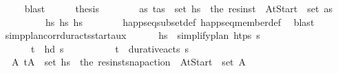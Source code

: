 \begin{isabellebody}
\ \ \ \ \ \ \isamarkupfalse%
\ blast\isanewline
\ \ \ \ \isamarkupfalse%
\ {\isacharquery}{\kern0pt}thesis\isanewline
\ \ \ \ \ \ \isamarkupfalse%
\ {\isacartoucheopen}{\isasymexists}as{\isachardot}{\kern0pt}\ {\isacharparenleft}{\kern0pt}t\isactrlsub {\isasympi}{\isacharcomma}{\kern0pt}as{\isacharparenright}{\kern0pt}\ {\isasymin}\ set\ hs{\isacharprime}{\kern0pt}\ {\isasymand}\ the\ {\isacharparenleft}{\kern0pt}res{\isacharunderscore}{\kern0pt}inst\ {\isasympi}\ At{\isacharunderscore}{\kern0pt}Start{\isacharparenright}{\kern0pt}\ {\isasymin}\ set\ as{\isacartoucheclose}\isanewline
\ \ \ \ \ \ \ \ \ \ \ \ {\isacartoucheopen}hs{\isacharprime}{\kern0pt}\ {\isasymsubseteq}\isactrlsub h\isactrlsub s\ hs{\isacartoucheclose}\isanewline
\ \ \ \ \ \ \isamarkupfalse%
\ happ{\isacharunderscore}{\kern0pt}seq{\isacharunderscore}{\kern0pt}subset{\isacharunderscore}{\kern0pt}def\ happ{\isacharunderscore}{\kern0pt}seq{\isacharunderscore}{\kern0pt}member{\isacharunderscore}{\kern0pt}def\ \isamarkupfalse%
\ blast\isanewline
\ \ \isamarkupfalse%
%
\endisatagproof
{\isafoldproof}%
%
\isadelimproof
\isanewline
%
\endisadelimproof
\isanewline
\ \ \isamarkupfalse%
\ simp{\isacharunderscore}{\kern0pt}plan{\isacharunderscore}{\kern0pt}corr{\isacharunderscore}{\kern0pt}dur{\isacharunderscore}{\kern0pt}acts{\isacharunderscore}{\kern0pt}start{\isacharunderscore}{\kern0pt}aux{\isacharcolon}{\kern0pt}\ \isanewline
\ \ \ \ \ {\isachardoublequoteopen}hs\ {\isacharequal}{\kern0pt}\ simplify{\isacharunderscore}{\kern0pt}plan\ htps\ {\isasympi}s{\isachardoublequoteclose}\ \isanewline
\ \ \ \ \ \ \ \ \ {\isachardoublequoteopen}{\isacharparenleft}{\kern0pt}t\isactrlsub {\isasympi}{\isacharcomma}{\kern0pt}{\isasympi}{\isacharparenright}{\kern0pt}\ {\isacharequal}{\kern0pt}\ hd\ {\isasympi}s{\isachardoublequoteclose}\ \isanewline
\ \ \ \ \ \ \ \ \ {\isachardoublequoteopen}{\isacharparenleft}{\kern0pt}t\isactrlsub {\isasympi}{\isacharcomma}{\kern0pt}{\isasympi}{\isacharparenright}{\kern0pt}\ {\isasymin}\ durative{\isacharunderscore}{\kern0pt}acts\ {\isasympi}s{\isachardoublequoteclose}\isanewline
\ \ \ \ \ {\isachardoublequoteopen}{\isacharparenleft}{\kern0pt}{\isasymexists}A{\isachardot}{\kern0pt}\ {\isacharparenleft}{\kern0pt}t\isactrlsub {\isasympi}{\isacharcomma}{\kern0pt}A{\isacharparenright}{\kern0pt}\ {\isasymin}\ set\ hs\ {\isasymand}\ {\isacharparenleft}{\kern0pt}the\ {\isacharparenleft}{\kern0pt}res{\isacharunderscore}{\kern0pt}inst{\isacharunderscore}{\kern0pt}snap{\isacharunderscore}{\kern0pt}action\ {\isasympi}\ At{\isacharunderscore}{\kern0pt}Start{\isacharparenright}{\kern0pt}{\isacharparenright}{\kern0pt}\ {\isasymin}\ set\ A{\isacharparenright}{\kern0pt}{\isachardoublequoteclose}\isanewline

\end{isabellebody}
